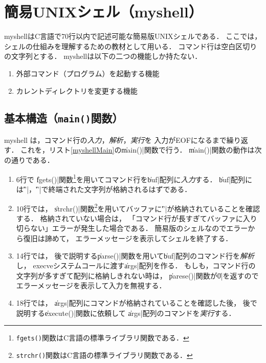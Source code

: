 \section{簡易UNIXシェル（myshell）}
myshellはC言語で70行以内で記述可能な簡易版UNIXシェルである．
ここでは，シェルの仕組みを理解するための教材として用いる．
コマンド行は空白区切りの文字列とする．
myshellは以下の二つの機能しか持たない．

\begin{enumerate}
\item 外部コマンド（プログラム）を起動する機能
\item カレントディレクトリを変更する機能
\end{enumerate}

\subsection{基本構造（\texttt{main()}関数）}
myshell は，コマンド行の\emph{入力}，\emph{解析}，\emph{実行}を
入力がEOFになるまで繰り返す．
これを，リスト\ref{myshellMain}の\|main()|関数で行う．
\|main()|関数の動作は次の通りである．



\begin{enumerate}
\item 6行で
  \|fgets()|関数\footnote{
    \texttt{fgets()}関数はC言語の標準ライブラリ関数である．
  }を用いてコマンド行を\|buf|配列に\emph{入力}する．
  \|buf|配列には\|'\n'|，\|'\0'|で終端された文字列が格納されるはずである．
\item 10行では，
  \|strchr()|関数\footnote{
    \texttt{strchr()}関数はC言語の標準ライブラリ関数である．
  }を用いてバッファに\|'\n'|が格納されていることを確認する．
  格納されていない場合は，
  「コマンド行が長すぎてバッファに入り切らない」エラーが発生した場合である．
  簡易版のシェルなのでエラーから復旧は諦めて，
  エラーメッセージを表示してシェルを終了する．
\item 14行では，
  後で説明する\|parse()|関数を用いて\|buf|配列のコマンド行を\emph{解析}し，
  execveシステムコールに渡す\|args|配列を作る．
  もしも，コマンド行の文字列が多すぎて配列に格納しきれない時は，
  \|parese()|関数が\|0|を返すのでエラーメッセージを表示して入力を無視する．
\item 18行では，
  \|args|配列にコマンドが格納されていることを確認した後，
  後で説明する\|execute()|関数に依頼して
  \|args|配列のコマンドを\emph{実行}する．
\end{enumerate}

